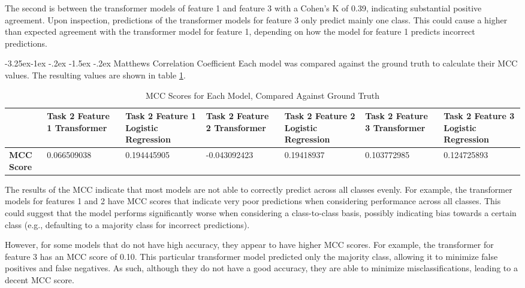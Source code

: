 \documentclass[10.7pt, onecolumn]{article}
\makeatletter
\renewcommand\subsubsection{\@startsection{subsubsection}{3}{\z@}%
	{-3.25ex\@plus -1ex \@minus -.2ex}%
    {-1.5ex \@plus -.2ex}%
    {\normalfont\itshape}}
\makeatother
\begin{document}
The second is between the transformer models of feature 1 and feature 3 with a Cohen's K of 0.39, indicating substantial positive agreement. Upon inspection, predictions of the transformer models for feature 3 only predict mainly one class. This could cause a higher than expected agreement with the transformer model for feature 1, depending on how the model for feature 1 predicts incorrect predictions.

\subsubsection{Matthews Correlation Coefficient}
Each model was compared against the ground truth to calculate their MCC values. The resulting values are shown in table \ref{tab:mccTab}.

\begin{table}[h!]
  \centering
  \small
  \begin{tabular}{|p{1cm}|p{2cm}|p{2cm}|p{2cm}|p{2cm}|p{2cm}|p{2cm}|}
      \hline
      & \textbf{Task 2 Feature 1 Transformer} & \textbf{Task 2 Feature 1 Logistic Regression} & \textbf{Task 2 Feature 2 Transformer} & \textbf{Task 2 Feature 2 Logistic Regression} & \textbf{Task 2 Feature 3 Transformer} & \textbf{Task 2 Feature 3 Logistic Regression} \\
      \hline
      \textbf{MCC Score} & 0.066509038 & 0.194445905 & -0.043092423 & 0.19418937 & 0.103772985 & 0.124725893 \\
      \hline
  \end{tabular}
  \caption{MCC Scores for Each Model, Compared Against Ground Truth}
  \label{tab:mccTab}
\end{table}

The results of the MCC indicate that most models are not able to correctly predict across all classes evenly. For example, the transformer models for features 1 and 2 have MCC scores that indicate very poor predictions when considering performance across all classes. This could suggest that the model performs significantly worse when considering a class-to-class basis, possibly indicating bias towards a certain class (e.g., defaulting to a majority class for incorrect predictions).

However, for some models that do not have high accuracy, they appear to have higher MCC scores. For example, the transformer for feature 3 has an MCC score of 0.10. This particular transformer model predicted only the majority class, allowing it to minimize false positives and false negatives. As such, although they do not have a good accuracy, they are able to minimize misclassifications, leading to a decent MCC score.
\end{document}
